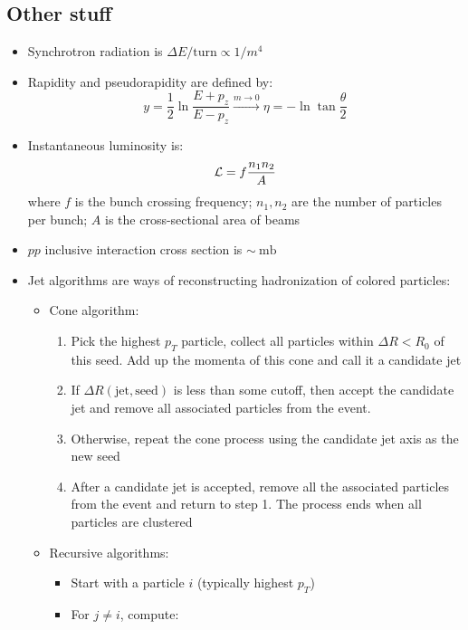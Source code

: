 \subsection{Other stuff}
\begin{itemize}
  \item Synchrotron radiation is $\Delta E/\text{turn} \propto 1/m^4$
  \item Rapidity and pseudorapidity are defined by:
  \begin{equation}
    y = \frac{1}{2}\ln \frac{E+p_z}{E-p_z} \xrightarrow{m\rightarrow 0} \eta = -\ln \tan \frac{\theta}{2}
  \end{equation}
  \item Instantaneous luminosity is:
  \begin{equation}
    \mathcal{L} = f \frac{n_1n_2}{A}
  \end{equation}
  where $f$ is the bunch crossing frequency; $n_1,n_2$ are the number of particles per bunch; $A$ is the cross-sectional area of beams
  \item $pp$ inclusive interaction cross section is $\sim~\text{mb}$
  \item Jet algorithms are ways of reconstructing hadronization of colored particles:
  \begin{itemize}
    \item Cone algorithm:
    \begin{enumerate}
      \item Pick the highest $p_T$ particle, collect all particles within $\Delta R < R_0$ of this seed. Add up the momenta of this cone and call it a candidate jet
      \item If $\Delta R(\text{jet},\text{seed})$ is less than some cutoff, then accept the candidate jet and remove all associated particles from the event. 
      \item Otherwise, repeat the cone process using the candidate jet axis as the new seed
      \item After a candidate jet is accepted, remove all the associated particles from the event and return to step 1. The process ends when all particles are clustered
    \end{enumerate}
    \item Recursive algorithms:
    \begin{itemize}
      \item Start with a particle $i$ (typically highest $p_T$)
      \item For $j\neq i$, compute:
      \begin{equation}

\end{equation}
\end{itemize}
\end{itemize}
\end{itemize}
